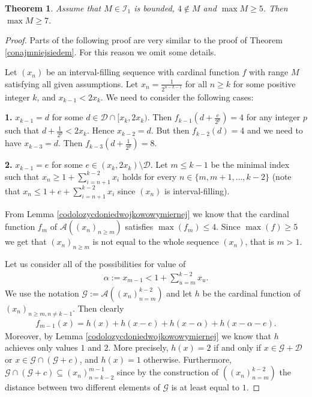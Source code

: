 \documentclass{amsart}
\newtheorem{theorem}{Theorem}[section]
\theoremstyle{definition}
\begin{document}
\begin{theorem}\label{niemaczworkitosiedem}
Assume that $M\in \mathcal{I}_1$ is bounded, $4\notin M$ and $\max M\geq 5$. Then $\max M\geq 7$.
\end{theorem}
\begin{proof}
Parts of the following proof are very similar to the proof of Theorem \ref{conajmniejsiedem}. For this reason we omit some details.

Let $(x_n)$ be an interval-filling sequence with cardinal function $f$ with range $M$ satisfying all given assumptions.
Let  $x_n=\frac{1}{2^{n-k-1}}$ for all $n\geq k$ for some positive integer $k$, and $x_{k-1}< 2x_k$. We need to consider the following cases: 

\vspace{0.15cm}

\noindent
{\bf 1.} $x_{k-1}=d$ for some $d\in \mathcal{D}\cap [x_{k},2x_{k})$. Then $f_{k-1}(d+\frac{c}{2^p})=4$ for any integer $p$ such that $d+\frac{1}{2^p}<2x_{k}$. Hence $x_{k-2}=d$. But then $f_{k-2}(d)=4$ and we need to have $x_{k-3}=d$. Then $f_{k-3}(d+\frac{1}{2^p})=8$.

\vspace{0.15cm}

\noindent 
{\bf 2.} $x_{k-1}=e$ for some $e\in  (x_{k},2x_{k})\setminus \mathcal{D}$. Let $m\leq k-1$ be the minimal index such that $x_n\geq 1+\sum_{i=n+1}^{k-2}x_i$ holds for every $n\in \{m,m+1,\ldots,k-2\}$ (note that $x_n\leq 1+e+\sum_{i=n+1}^{k-2}x_i$ since $(x_n)$ is interval-filling).

From Lemma \ref{codolozycdoniedwojkowowymiernej} we know that the cardinal function $f_m$ of $\mathcal{A}((x_n)_{n\geq m})$ satisfies $\max(f_m)\leq 4$. Since $\max(f)\geq 5$ we get that $(x_n)_{n\geq m}$ is not equal to the whole sequence $(x_n)$, that is $m>1$.

Let us consider all of the possibilities for value of 
\begin{align*}
\alpha:=x_{m-1}< 1+\sum_{u=m}^{k-2}x_u.
\end{align*}
We use the notation $\mathcal{G}:=\mathcal{A}((x_n)_{n=m}^{k-2})$ and let $h$ be the cardinal function of $(x_n)_{n\geq m,n\neq k-1}$. Then clearly
\begin{align*}
f_{m-1}(x)=h(x)+h(x-e)+h(x-\alpha)+h(x-\alpha-e).
\end{align*}
Moreover, by Lemma \ref{codolozycdoniedwojkowowymiernej} we know that $h$ achieves only values $1$ and $2$. More precisely, $h(x)=2$ if and only if $x\in \mathcal{G}+\mathcal{D}$ or $x\in \mathcal{G}\cap(\mathcal{G}+c)$, and $h(x)=1$ otherwise. Furthermore, $\mathcal{G}\cap(\mathcal{G}+c)\subseteq (x_n)_{n=k-2}^{m-1}$ since by the construction of $((x_n)_{n=m}^{k-2})$ the distance between two different elements of $\mathcal{G}$ is at least equal to $1$.


\end{proof}
\end{document}
